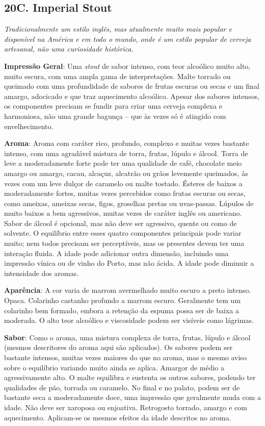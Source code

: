\subsection*{20C. Imperial Stout}
\textit{Tradicionalmente um estilo inglês, mas atualmente muito mais popular e disponível na América e em todo o mundo, onde é um estilo popular de cerveja artesanal, não uma curiosidade histórica.}

\textbf{Impressão Geral}: Uma \textit{stout} de sabor intenso, com teor alcoólico muito alto, muito escura, com uma ampla gama de interpretações. Malte torrado ou queimado com uma profundidade de sabores de frutas escuras ou secas e um final amargo, adocicado e que traz aquecimento alcoólico. Apesar dos sabores intensos, os componentes precisam se fundir para criar uma cerveja complexa e harmoniosa, não uma grande bagunça – que às vezes só é atingido com envelhecimento.

\textbf{Aroma}: Aroma com caráter rico, profundo, complexo e muitas vezes bastante intenso, com uma agradável mistura de torra, frutas, lúpulo e álcool. Torra de leve a moderadamente forte pode ter uma qualidade de café, chocolate meio amargo ou amargo, cacau, alcaçuz, alcatrão ou grãos levemente queimados, às vezes com um leve dulçor de caramelo ou malte tostado. Ésteres de baixos a moderadamente fortes, muitas vezes percebidos como frutas escuras ou secas, como ameixas, ameixas secas, figos, groselhas pretas ou uvas-passas. Lúpulos de muito baixos a bem agressivos, muitas vezes de caráter inglês ou americano. Sabor de álcool é opcional, mas não deve ser agressivo, quente ou como de solvente. O equilíbrio entre esses quatro componentes principais pode variar muito; nem todos precisam ser perceptíveis, mas os presentes devem ter uma interação fluida. A idade pode adicionar outra dimensão, incluindo uma impressão vínica ou de vinho do Porto, mas não ácida. A idade pode diminuir a intensidade dos aromas.

\textbf{Aparência}: A cor varia de marrom avermelhado muito escuro a preto intenso. Opaca. Colarinho castanho profundo a marrom escuro. Geralmente tem um colarinho bem formado, embora a retenção da espuma possa ser de baixa a moderada. O alto teor alcoólico e viscosidade podem ser visíveis como lágrimas.

\textbf{Sabor}: Como o aroma, uma mistura complexa de torra, frutas, lúpulo e álcool (mesmos descritores do aroma aqui são aplicados). Os sabores podem ser bastante intensos, muitas vezes maiores do que no aroma, mas o mesmo aviso sobre o equilíbrio variando muito ainda se aplica. Amargor de médio a agressivamente alto. O malte equilibra e sustenta os outros sabores, podendo ter qualidades de pão, torrada ou caramelo. No final e no palato, podem ser de bastante seca a moderadamente doce, uma impressão que geralmente muda com a idade. Não deve ser xaroposa ou enjoativa. Retrogosto torrado, amargo e com aquecimento. Aplicam-se os mesmos efeitos da idade descritos no aroma.

